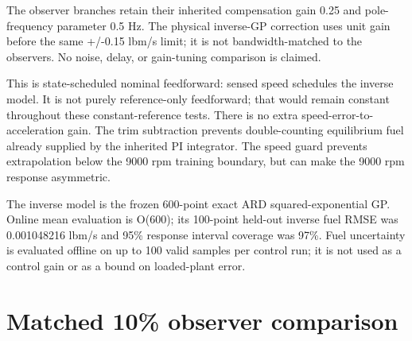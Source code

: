 The observer branches retain their inherited compensation gain 0.25 and pole-frequency parameter 0.5 Hz. The physical inverse-GP correction uses unit gain before the same +/-0.15 lbm/s limit; it is not bandwidth-matched to the observers. No noise, delay, or gain-tuning comparison is claimed.

This is state-scheduled nominal feedforward: sensed speed schedules the inverse model. It is not purely reference-only feedforward; that would remain constant throughout these constant-reference tests. There is no extra speed-error-to-acceleration gain. The trim subtraction prevents double-counting equilibrium fuel already supplied by the inherited PI integrator. The speed guard prevents extrapolation below the 9000 rpm training boundary, but can make the 9000 rpm response asymmetric.

The inverse model is the frozen 600-point exact ARD squared-exponential GP. Online mean evaluation is O(600); its 100-point held-out inverse fuel RMSE was 0.001048216 lbm/s and 95\% response interval coverage was 97\%. Fuel uncertainty is evaluated offline on up to 100 valid samples per control run; it is not used as a control gain or as a bound on loaded-plant error.

\section{Matched 10\% observer comparison}


